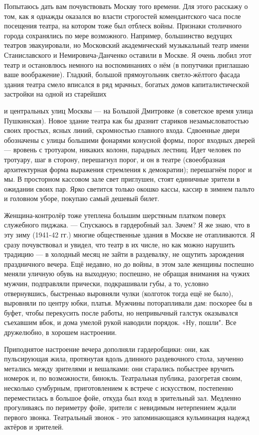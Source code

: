 \label{224-1}
Попытаюсь дать вам почувствовать Москву того времени. Для этого расскажу о том, как я однажды оказался во власти строгостей комендантского часа после посещения театра, на котором тоже был отблеск войны. Признаки столичного города сохранялись по мере возможного. Например, большинство ведущих театров эвакуировали, но Московский академический музыкальный театр имени Станиславского и Немировича-Данченко оставили в Москве. Я очень любил этот театр и остановлюсь немного на воспоминаниях о нём (в попутчики приглашаю ваше воображение). Гладкий, большой прямоугольник светло-жёлтого фасада здания театра смело вписался в ряд мрачных, богатых домов капиталистической застройки на одной из старейших

\label{225-1}
и центральных улиц Москвы — на Большой Дмитровке (в советское время улица Пушкинская). Новое здание театра как бы дразнит стариков незамысловатостью своих простых, ясных линий, скромностью главного входа. Сдвоенные двери обозначены с улицы большими фонарями конусной формы, порог входных дверей — вровень с тротуаром, никаких колонн, парадных лестниц. Идет человек по тротуару, шаг в сторону, перешагнул порог, и он в театре (своеобразная архитектурная форма выражения стремления к демократии); перешагнём порог и мы. В просторном кассовом зале свет приглушен, стоят единичные зрители в ожидании своих пар. Ярко светится только окошко кассы, кассир в зимнем пальто и головном уборе, покупаю самый дешевый билет.

\label{226-1}
 Женщина-контролёр тоже утеплена большим шерстяным платком поверх служебного пиджака. — Спускаюсь в гардеробный зал. Зачем? Я же знаю, что в эту зиму (1941-42 гг.) многие общественные здания в Москве не отапливаются. Я сразу почувствовал и увидел, что театр в их числе, но как можно нарушить традицию — в холодный месяц не зайти в раздевалку, не ощутить зарождения праздничного вечера. Ещё недавно, но до войны, в этом зале женщины поспешно меняли уличную обувь на выходную; поспешно, не обращая внимания на чужих мужчин, подправляли прически, подкрашивали губы, а то, условно отвернувшись, быстренько выровняли чулки  (колготок тогда ещё не было), выровняли по центру юбки, платья. Мужчины поторапливали дам: поскорее бы в буфет, чтобы перекусить после работы, но непривычный галстук оказывался съехавшим вбок, и дома умелой рукой наводили порядок. «Ну, пошли". Все дружелюбно, в хорошем настроении.

\label{227-1}
Приподнятое настроение вечера дополняли гардеробщики: они, как пульсирующая жила, протянутая вдоль длинного раздевочного стола, заученно метались между зрителями и вешалками: они старались побыстрее вручить номерок и, по возможности, бинокль. Театральная публика, разогретая своим, несколько сумбурным, приготовлением к встрече с искусством, постепенно переместилась в большое фойе, откуда был вход в зрительный зал. Медленно прогуливаясь по периметру фойе, зрители с невидимым нетерпением ждали первого звонка. Театральный звонок - это запоминающаяся кульминация надежд актёров и зрителей.

